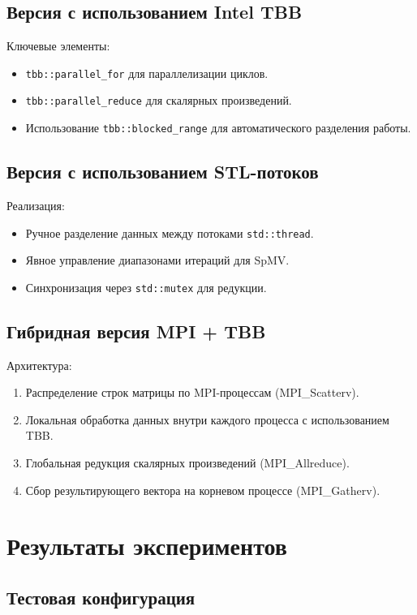 \documentclass[12pt]{article}
\begin{document}
\subsection{Версия с использованием Intel TBB}

Ключевые элементы:
\begin{itemize}
    \item \texttt{tbb::parallel\_for} для параллелизации циклов.
    \item \texttt{tbb::parallel\_reduce} для скалярных произведений.
    \item Использование \texttt{tbb::blocked\_range} для автоматического разделения работы.
\end{itemize}

\subsection{Версия с использованием STL-потоков}

Реализация:
\begin{itemize}
    \item Ручное разделение данных между потоками \texttt{std::thread}.
    \item Явное управление диапазонами итераций для SpMV.
    \item Синхронизация через \texttt{std::mutex} для редукции.
\end{itemize}

\subsection{Гибридная версия MPI + TBB}

Архитектура:
\begin{enumerate}
    \item Распределение строк матрицы по MPI-процессам (MPI\_Scatterv).
    \item Локальная обработка данных внутри каждого процесса с использованием TBB.
    \item Глобальная редукция скалярных произведений (MPI\_Allreduce).
    \item Сбор результирующего вектора на корневом процессе (MPI\_Gatherv).
\end{enumerate}

\section{Результаты экспериментов}

\subsection{Тестовая конфигурация}
\end{document}
